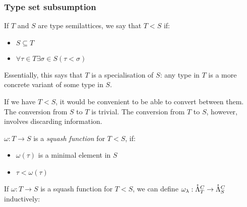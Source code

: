\documentclass[main.tex]{subfiles}
\begin{document}
\subsubsection{Type set subsumption}
\begin{defn}
    If $T$ and $S$ are type semilattices, we say that $T \less S$ if:
    \begin{itemize}
        \item $S \subseteq T$
        \item $\forall \tau \in T \exists \sigma \in S ( \tau \less \sigma )$
    \end{itemize}

    Essentially, this says that $T$ is a specialisation of $S$: any type in
    $T$ is a more concrete variant of some type in $S$.
\end{defn}

If we have $T \less S$, it would be convenient to be able to convert between them.
The conversion from $S$ to $T$ is trivial. The conversion from $T$ to $S$,
however, involves discarding information.


\begin{defn}
    $\omega: T \rightarrow S$ is a \emph{squash function} for $T \less S$, if:
    \begin{itemize}
        \item $\omega(\tau)$ is a minimal element in $S$
        \item $\tau \less \omega(\tau)$
    \end{itemize}
\end{defn}

\begin{defn}
    If $\omega: T \rightarrow S$ is a squash function for $T \less S$, we can define
    $\omega_{\lambda}: \mathring{\Lambda}_T^C \rightarrow \mathring{\Lambda}_S^C$ inductively:
\end{defn}
\end{document}
